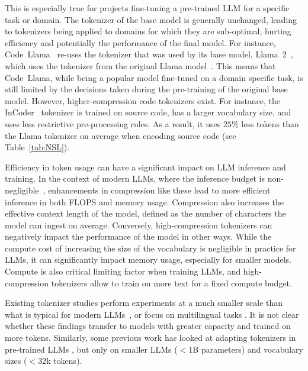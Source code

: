 This is especially true for projects fine-tuning a pre-trained LLM for a specific task or domain. The tokenizer of the base model is generally unchanged, leading to tokenizers being applied to domains for which they are sub-optimal, hurting efficiency and potentially the performance of the final model. For instance, Code~Llama~\cite{roziere2023code} re-uses the tokenizer that was used by its base model, Llama~2~\cite{touvron2023llama2}, which uses the tokenizer from the original Llama model~\cite{touvron2023llama}. This means that Code~Llama, while being a popular model fine-tuned on a domain specific task, is still limited by the decisions taken during the pre-training of the original base model. However, higher-compression code tokenizers exist. For instance, the InCoder~\cite{incoder} tokenizer is trained on source code, has a larger vocabulary size, and uses less restrictive pre-processing rules. As a result, it uses $25\%$ less tokens than the Llama tokenizer on average when encoding source code (see Table~\ref{tab:NSL}).

Efficiency in token usage can have a significant impact on LLM inference and training. In the context of modern LLMs, where the inference budget is non-negligible~\citep{touvron2023llama}, enhancements in compression like these lead to more efficient inference in both FLOPS and memory usage. Compression also increases the effective context length of the model, defined as the number of characters the model can ingest on average. Conversely, high-compression tokenizers can negatively impact the performance of the model in other ways. While the compute cost of increasing the size of the vocabulary is negligible in practice for LLMs, it can significantly impact memory usage, especially for smaller models. Compute is also critical limiting factor when training LLMs, and high-compression tokenizers allow to train on more text for a fixed compute budget. 

Existing tokenizer studies perform experiments at a much smaller scale than what is typical for modern LLMs~\cite{gowda2020finding,Chirkova_Troshin_2022}, or focus on multilingual tasks \cite{rust-etal-2021-good,limisiewicz-etal-2023-tokenization,Zouhar_Meister_Gastaldi_Du_Sachan_Cotterell_2023}. It is not clear whether these findings transfer to models with greater capacity and trained on more tokens. Similarly, some previous work has looked at adapting tokenizers in pre-trained LLMs \cite{vipi,FVT,gee-etal-2023-multi}, but only on smaller LLMs ($<1$B parameters) and vocabulary sizes ($<32$k tokens).

